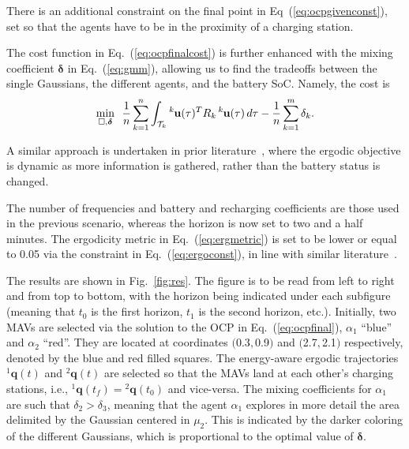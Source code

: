 \documentclass[letterpaper,10pt,conference,twoside]{IEEEtran}
\theoremstyle{definition}
\begin{document}
There is an additional constraint on the final point in Eq~(\ref{eq:ocpgivenconst}), set so that the agents have to be in the proximity of a charging station. %

The cost function in Eq.~(\ref{eq:ocpfinalcost}) is further enhanced with the mixing coefficient $\boldsymbol{\delta}$ in Eq.~(\ref{eq:gmm}), allowing us to find the tradeoffs between the single Gaussians, the different agents, and the battery SoC. Namely, the cost is
\begin{equation}
  \min_{\square,\boldsymbol{\delta}}\,\,\,{\frac{1}{n}\sum_{k=1}^{n}\int_{\mathcal{T}_k}{}^k\hspace*{-.1ex}\mathbf{u}(\tau)^TR_k\,{}^k\hspace*{-.1ex}\mathbf{u}(\tau)\,d\tau-\frac{1}{n}\sum_{k=1}^{m}\delta_k}.
\end{equation}

A similar approach is undertaken in prior literature~\cite{rao2023multi}, where the ergodic objective is dynamic as more information is gathered, rather than the battery status is changed.

The number of frequencies and battery and recharging coefficients are those used in the previous scenario, whereas the horizon is now set to two and a half minutes.
The ergodicity metric in Eq.~(\ref{eq:ergmetric}) is set to be lower or equal to 0.05 via the constraint in Eq.~(\ref{eq:ergoconst}), in line with similar literature~\cite{dong2023time}.

The results are shown in Fig.~\ref{fig:res}. The figure is to be read from left to right and from top to bottom, with the horizon being indicated under each subfigure (meaning that $t_0$ is the first horizon, $t_1$ is the second horizon, etc.). Initially, two MAVs are selected via the solution to the OCP in Eq.~(\ref{eq:ocpfinal}), $\alpha_1$ ``blue'' and $\alpha_2$ ``red''. They are located at coordinates $($0.3$,$0.9$)$ and $($2.7$,$2.1$)$ respectively, denoted by the blue and red filled squares. The energy-aware ergodic trajectories ${}^1\mathbf{q}(t)$ and ${}^2\mathbf{q}(t)$ are selected so that the MAVs land at each other's charging stations, i.e., ${}^1\mathbf{q}(t_f)={}^2\mathbf{q}(t_0)$ and vice-versa. The mixing coefficients for $\alpha_1$ are such that $\delta_2>\delta_3$, meaning that the agent $\alpha_1$ explores in more detail the area delimited by the Gaussian centered in $\mu_2$. This is indicated by the darker coloring of the different Gaussians, which is proportional to the optimal value of $\boldsymbol{\delta}$. 
\end{document}
